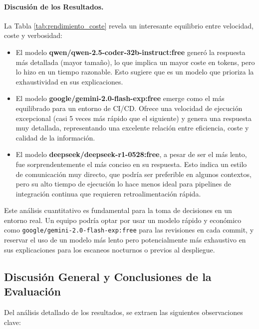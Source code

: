 \paragraph{Discusión de los Resultados.}
La Tabla \ref{tab:rendimiento_coste} revela un interesante equilibrio entre velocidad, coste y verbosidad:
\begin{itemize}
    \item El modelo \textbf{qwen/qwen-2.5-coder-32b-instruct:free} generó la respuesta más detallada (mayor tamaño), lo que implica un mayor coste en tokens, pero lo hizo en un tiempo razonable. Esto sugiere que es un modelo que prioriza la exhaustividad en sus explicaciones.
    \item El modelo \textbf{google/gemini-2.0-flash-exp:free} emerge como el más equilibrado para un entorno de CI/CD. Ofrece una velocidad de ejecución excepcional (casi 5 veces más rápido que el siguiente) y genera una respuesta muy detallada, representando una excelente relación entre eficiencia, coste y calidad de la información.
    \item El modelo \textbf{deepseek/deepseek-r1-0528:free}, a pesar de ser el más lento, fue sorprendentemente el más conciso en su respuesta. Esto indica un estilo de comunicación muy directo, que podría ser preferible en algunos contextos, pero su alto tiempo de ejecución lo hace menos ideal para pipelines de integración continua que requieren retroalimentación rápida.
\end{itemize}

Este análisis cuantitativo es fundamental para la toma de decisiones en un entorno real. Un equipo podría optar por usar un modelo rápido y económico como \texttt{google/gemini-2.0-flash-exp:free} para las revisiones en cada commit, y reservar el uso de un modelo más lento pero potencialmente más exhaustivo en sus explicaciones para los escaneos nocturnos o previos al despliegue.


\subsection{Discusión General y Conclusiones de la Evaluación}

Del análisis detallado de los resultados, se extraen las siguientes observaciones clave:

